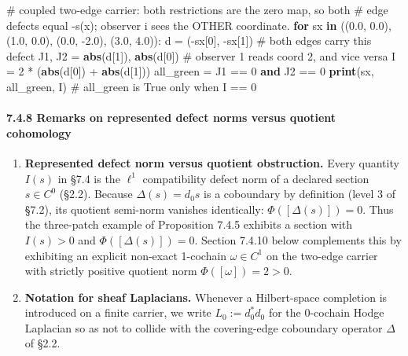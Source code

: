 \documentclass[
  11pt,
]{article}
\newenvironment{Shaded}{\begin{snugshade}}{\end{snugshade}}
\newcommand{\BuiltInTok}[1]{\textcolor[rgb]{0.39,0.29,0.61}{\textbf{#1}}}
\newcommand{\CommentTok}[1]{\textcolor[rgb]{0.54,0.53,0.53}{#1}}
\newcommand{\ControlFlowTok}[1]{\textcolor[rgb]{0.12,0.11,0.11}{\textbf{#1}}}
\newcommand{\DecValTok}[1]{\textcolor[rgb]{0.69,0.50,0.00}{#1}}
\newcommand{\FloatTok}[1]{\textcolor[rgb]{0.69,0.50,0.00}{#1}}
\newcommand{\KeywordTok}[1]{\textcolor[rgb]{0.12,0.11,0.11}{\textbf{#1}}}
\newcommand{\NormalTok}[1]{\textcolor[rgb]{0.12,0.11,0.11}{#1}}
\newcommand{\OperatorTok}[1]{\textcolor[rgb]{0.12,0.11,0.11}{#1}}
\providecommand{\tightlist}{%
  \setlength{\itemsep}{0pt}\setlength{\parskip}{0pt}}
\providecommand{\tightlist}{%
  \setlength{\itemsep}{0pt}\setlength{\parskip}{0pt}}
\begin{document}
\begin{Shaded}
\begin{Highlighting}[]
\CommentTok{\# coupled two{-}edge carrier: both restrictions are the zero map, so both}
\CommentTok{\# edge defects equal {-}s(x); observer i sees the OTHER coordinate.}
\ControlFlowTok{for}\NormalTok{ sx }\KeywordTok{in}\NormalTok{ ((}\FloatTok{0.0}\NormalTok{, }\FloatTok{0.0}\NormalTok{), (}\FloatTok{1.0}\NormalTok{, }\FloatTok{0.0}\NormalTok{), (}\FloatTok{0.0}\NormalTok{, }\OperatorTok{{-}}\FloatTok{2.0}\NormalTok{), (}\FloatTok{3.0}\NormalTok{, }\FloatTok{4.0}\NormalTok{)):}
\NormalTok{    d }\OperatorTok{=}\NormalTok{ (}\OperatorTok{{-}}\NormalTok{sx[}\DecValTok{0}\NormalTok{], }\OperatorTok{{-}}\NormalTok{sx[}\DecValTok{1}\NormalTok{])            }\CommentTok{\# both edges carry this defect}
\NormalTok{    J1, J2 }\OperatorTok{=} \BuiltInTok{abs}\NormalTok{(d[}\DecValTok{1}\NormalTok{]), }\BuiltInTok{abs}\NormalTok{(d[}\DecValTok{0}\NormalTok{])   }\CommentTok{\# observer 1 reads coord 2, and vice versa}
\NormalTok{    I }\OperatorTok{=} \DecValTok{2} \OperatorTok{*}\NormalTok{ (}\BuiltInTok{abs}\NormalTok{(d[}\DecValTok{0}\NormalTok{]) }\OperatorTok{+} \BuiltInTok{abs}\NormalTok{(d[}\DecValTok{1}\NormalTok{]))}
\NormalTok{    all\_green }\OperatorTok{=}\NormalTok{ J1 }\OperatorTok{==} \DecValTok{0} \KeywordTok{and}\NormalTok{ J2 }\OperatorTok{==} \DecValTok{0}
    \BuiltInTok{print}\NormalTok{(sx, all\_green, I)         }\CommentTok{\# all\_green is True only when I == 0}
\end{Highlighting}
\end{Shaded}

\paragraph{7.4.8 Remarks on represented defect norms versus quotient cohomology}\label{remarks-on-represented-defect-norms-versus-quotient-cohomology}

\begin{enumerate}
\def\labelenumi{\arabic{enumi}.}
\tightlist
\item
  \textbf{Represented defect norm versus quotient obstruction.} Every quantity \(I(s)\) in §7.4 is the \(\ell^1\) compatibility defect norm of a declared section \(s\in C^0\) (§2.2). Because \(\Delta(s)=d_0 s\) is a coboundary by definition (level 3 of §7.2), its quotient semi-norm vanishes identically: \(\Phi([\Delta(s)])=0\). Thus the three-patch example of Proposition 7.4.5 exhibits a section with \(I(s)>0\) and \(\Phi([\Delta(s)])=0\). Section 7.4.10 below complements this by exhibiting an explicit non-exact 1-cochain \(\omega\in C^1\) on the two-edge carrier with strictly positive quotient norm \(\Phi([\omega])=2>0\).
\item
  \textbf{Notation for sheaf Laplacians.} Whenever a Hilbert-space completion is introduced on a finite carrier, we write \(L_0 := d_0^{*} d_0\) for the 0-cochain Hodge Laplacian so as not to collide with the covering-edge coboundary operator \(\Delta\) of §2.2.
\end{enumerate}
\end{document}
